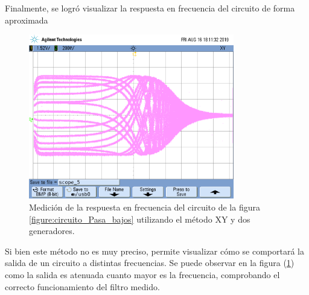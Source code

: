 \documentclass[11pt, a4paper]{article}
\begin{document}
Finalmente, se logró visualizar la respuesta en frecuencia del circuito de forma aproximada

\begin{figure}[H]
	\centering
	\includegraphics[width=0.8\textwidth,trim={0.5cm 5cm  1 5cm},clip]{ej3xy.png}
	\caption{Medición de la respuesta en frecuencia del circuito de la figura \ref{figure:circuito_Pasa_bajos} utilizando el método XY y dos generadores.} 
	\label{graf:osci_freq_alta}
\end{figure}

Si bien este método no es muy preciso, permite visualizar cómo se comportará la salida de un circuito a distintas frecuencias. Se puede observar en la figura (\ref{graf:osci_freq_alta}) como la salida es atenuada cuanto mayor es la frecuencia, comprobando el correcto funcionamiento del filtro medido.
\end{document}
